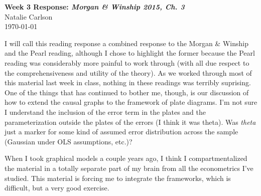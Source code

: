 \documentclass[12pt]{article}
\begin{document}
\begin{center}
  \Large \textbf{Week 3 Response: \textit{Morgan \& Winship 2015, Ch. 3}} \\
  \vspace{0.1in}
  \normalsize Natalie Carlson \\
  \today
\end{center}

I will call this reading response a combined response to the Morgan \& Winship and the Pearl reading, although I chose to highlight the former because the Pearl reading was considerably more painful to work through (with all due respect to the comprehensiveness and utility of the theory). As we worked through most of this material last week in class, nothing in these readings was terribly suprising. One of the things that has continued to bother me, though, is our discussion of how to extend the causal graphs to the framework of plate diagrams. I'm not sure I understand the inclusion of the error term in the plates and the parameterization outside the plates of the errors (I think it was theta). Was \textit{theta} just a marker for some kind of assumed error distribution across the sample (Gaussian under OLS assumptions, etc.)? 

When I took graphical models a couple years ago, I think I compartmentalized the material in a totally separate part of my brain from all the econometrics I've studied. This material is forcing me to integrate the frameworks, which is difficult, but a very good exercise.
\end{document}
